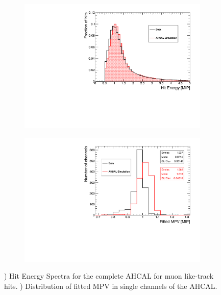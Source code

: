 \begin{figure}[htbp!]
	\begin{subfigure}[t]{0.5\textwidth}
		\centering
		\includegraphics[width=1\linewidth]{chap5/fig_EnergyCalib/ComparisonMCData_MIPPeak.pdf}
		\caption{} \label{fig:MIPData_MC}
	\end{subfigure}
	\hfill
	\begin{subfigure}[t]{0.5\textwidth}
		\centering
		\includegraphics[width=1\linewidth]{chap5/fig_EnergyCalib/ComparisonMCData_MPV.pdf}
		\caption{} \label{fig:MPVData_MC}
	\end{subfigure}
	\caption{) Hit Energy Spectra for the complete AHCAL for muon like-track hits. ) Distribution of fitted MPV in single channels of the AHCAL.}
\end{figure}

